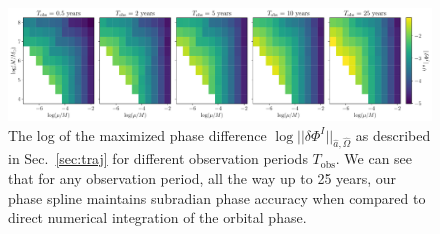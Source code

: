 \documentclass[%
 reprint,
 nofootinbib,
 amsmath,amssymb,
 aps,
 prd,
]{revtex4-2}
\begin{document}

\begin{figure}[!htp]
    \centering
    \includegraphics[width=0.99\linewidth]{figures/deltaPhiTest.pdf}
    \caption{The log of the maximized phase difference $\log||\delta \Phi^I||_{\hat{a}, \hat{\Omega}}$ as described in Sec.~\ref{sec:traj} for different observation periods $T_\mathrm{obs}$. We can see that for any observation period, all the way up to 25 years, our phase spline maintains subradian phase accuracy when compared to direct numerical integration of the orbital phase.}
    \label{fig:obsTime}
\end{figure}
\end{document}
